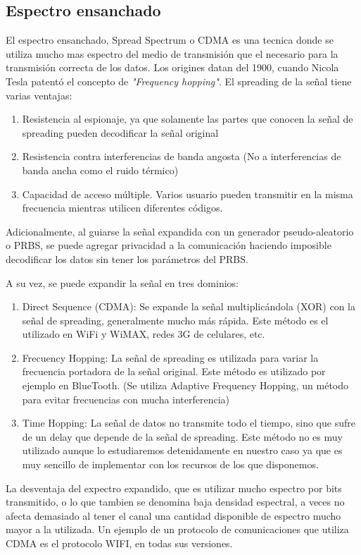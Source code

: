 \documentclass[a4paper,10pt]{report}
\begin{document}
\subsection{Espectro ensanchado}
\label{espectroensanchado}
El espectro ensanchado, Spread Spectrum o CDMA es una tecnica donde se utiliza mucho mas espectro del medio de transmisión que el necesario para la transmisión correcta de los datos.
Los origines datan del 1900, cuando Nicola Tesla patentó el concepto de \textit{"Frequency hopping"}.
El spreading de la señal tiene varias ventajas:
\begin{enumerate} 
\item Resistencia al espionaje, ya que solamente las partes que conocen la señal de spreading pueden decodificar la señal original
\item Resistencia contra interferencias de banda angosta (No a interferencias de banda ancha como el ruido térmico)
\item Capacidad de acceso múltiple. Varios usuario pueden transmitir en la misma frecuencia mientras utilicen diferentes códigos.
\end{enumerate} 
Adicionalmente, al guiarse la señal expandida con un generador pseudo-aleatorio o PRBS, se puede agregar privacidad a la comunicación haciendo imposible decodificar los datos sin tener los parámetros del PRBS.

A su vez, se puede expandir la señal en tres dominios:
\begin{enumerate} 
\item Direct Sequence (CDMA): Se expande la señal multiplicándola (XOR) con la señal de spreading, generalmente mucho más rápida. Este método es el utilizado en WiFi y WiMAX, redes 3G de celulares, etc.
\item Frecuency Hopping: La señal de spreading es utilizada para variar la frecuencia portadora de la señal original. Este método es utilizado por ejemplo en BlueTooth. (Se utiliza Adaptive Frequency Hopping, un método para evitar frecuencias con mucha interferencia)
\item Time Hopping: La señal de datos no transmite todo el tiempo, sino que sufre de un delay que depende de la señal de spreading. Este método no es muy utilizado aunque lo estudiaremos detenidamente en nuestro caso ya que es muy sencillo de implementar con los recursos de los que disponemos.
\end{enumerate} 


La desventaja del expectro expandido, que es utilizar mucho espectro por bits transmitido, o lo que tambien se denomina baja densidad espectral, a veces no afecta demasiado al tener el canal una cantidad disponible de espectro mucho mayor a la utilizada. Un ejemplo de un protocolo de comunicaciones que utiliza CDMA es el protocolo WIFI, en todas sus versiones.
\end{document}
